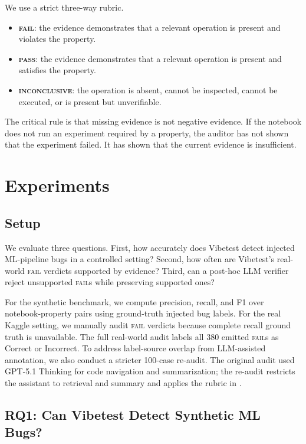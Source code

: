 \documentclass[11pt]{article}
\begin{document}
We use a strict three-way rubric.
\begin{itemize}
  \item \textbf{\textsc{fail}}: the evidence demonstrates that a relevant operation is present and violates the property.
  \item \textbf{\textsc{pass}}: the evidence demonstrates that a relevant operation is present and satisfies the property.
  \item \textbf{\textsc{inconclusive}}: the operation is absent, cannot be inspected, cannot be executed, or is present but unverifiable.
\end{itemize}

The critical rule is that missing evidence is not negative evidence.
If the notebook does not run an experiment required by a property, the auditor has not shown that the experiment failed.
It has shown that the current evidence is insufficient.

\section{Experiments}
\label{sec:experiments}

\subsection{Setup}

We evaluate three questions.
First, how accurately does Vibetest detect injected ML-pipeline bugs in a controlled setting?
Second, how often are Vibetest's real-world \textsc{fail} verdicts supported by evidence?
Third, can a post-hoc LLM verifier reject unsupported \textsc{fail}s while preserving supported ones?

For the synthetic benchmark, we compute precision, recall, and F1 over notebook-property pairs using ground-truth injected bug labels.
For the real Kaggle setting, we manually audit \textsc{fail} verdicts because complete recall ground truth is unavailable.
The full real-world audit labels all 380 emitted \textsc{fail}s as Correct or Incorrect.
To address label-source overlap from LLM-assisted annotation, we also conduct a stricter 100-case re-audit.
The original audit used GPT-5.1 Thinking for code navigation and summarization; the re-audit restricts the assistant to retrieval and summary and applies the rubric in .

\subsection{RQ1: Can Vibetest Detect Synthetic ML Bugs?}
\end{document}
